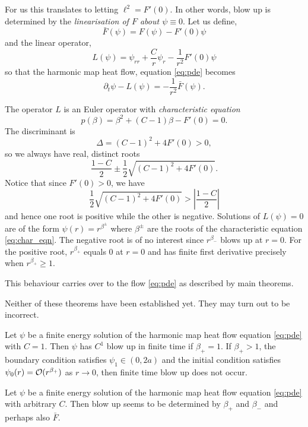 \documentclass{amsart}
\begin{document}
For us this translates to letting \(\ell^2 = F'(0)\). In other words, blow up is determined by the \emph{linearisation of \(F\) about \(\psi \equiv 0\)}. Let us define,
\[
\bar{F} (\psi) = F(\psi) - F'(0) \psi
\]
and the linear operator,
\begin{equation}
\label{eq:L}
L(\psi) = \psi_{rr} + \frac{C}{r} \psi_r - \frac{1}{r^2} F'(0) \psi
\end{equation}
so that the harmonic map heat flow, equation \eqref{eq:pde} becomes
\begin{equation}
\partial_t \psi - L(\psi) = - \frac{1}{r^2} \bar{F}(\psi).
\end{equation}

The operator \(L\) is an Euler operator with \emph{characteristic equation}
\begin{equation}
\label{eq:char_eqn}
p(\beta) = \beta^2 + (C-1) \beta - F'(0) = 0.
\end{equation}
The discriminant is
\[
\Delta = (C-1)^2 + 4 F'(0) > 0,
\]
so we always have real, distinct roots
\[
\frac{1 - C}{2} \pm \frac{1}{2} \sqrt{(C-1)^2 + 4 F'(0)}.
\]
Notice that since \(F'(0) > 0\), we have
\[
\frac{1}{2} \sqrt{(C-1)^2 + 4 F'(0)} > \left|\frac{1-C}{2}\right|
\]
and hence one root is positive while the other is negative. Solutions of \(L(\psi) = 0\) are of the form \(\psi(r) = r^{\beta^{\pm}}\) where \(\beta^{\pm}\) are the roots of the characteristic equation \eqref{eq:char_eqn}. The negative root is of no interest since \(r^{\beta_-}\) blows up at \(r = 0\). For the positive root, \(r^{\beta_+}\) equals \(0\) at \(r = 0\) and has finite first derivative precisely when \(r^{\beta_+} \geq 1\).

This behaviour carries over to the flow \eqref{eq:pde} as described by main theorems.

{\color{red} Neither of these theorems have been established yet. They may turn out to be incorrect.}

\begin{mainthm}[Finite time blow up for \(C = 1\)]
\label{thm:mainC1}
Let \(\psi\) be a finite energy solution of the harmonic map heat flow equation \eqref{eq:pde} with \(C = 1\). Then \(\psi\) has \(C^1\) blow up in finite time if \(\beta_+ = 1\). If \(\beta_+ > 1\), the boundary condition satisfies \(\psi_1 \in (0, 2a)\) and the initial condition satisfies \(\psi_0(r) = \operatorname{\mathcal{O}}(r^{\beta_+})\) as \(r\to 0\), then finite time blow up does not occur.
\end{mainthm}

\begin{mainthm}
\label{thm:mainC}
Let \(\psi\) be a finite energy solution of the harmonic map heat flow equation \eqref{eq:pde} with arbitrary \(C\). {\color{red}Then blow up seems to be determined by \(\beta_+\) and \(\beta_-\) and perhaps also \(\bar{F}\)}.
\end{mainthm}
\end{document}
